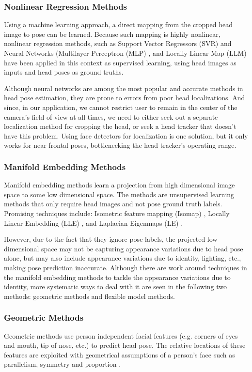 \documentclass{ut-thesis}
\begin{document}
\subsubsection{Nonlinear Regression Methods}
Using a machine learning approach, a direct mapping from the cropped head image to pose can be learned.  Because such mapping is highly nonlinear, nonlinear regression methods, such as Support Vector Regressors (SVR) \cite{li2000support} and Neural Networks (Multilayer Perceptron (MLP) \cite{voit2008head}, and Locally Linear Map (LLM) \cite{kruger2002gabor} have been applied in this context as supervised learning, using head images as inputs and head poses as ground truths.

Although neural networks are among the most popular and accurate methods in head pose estimation, they are prone to errors from poor head localizations.  And since, in our application, we cannot restrict user to remain in the center of the camera's field of view at all times, we need to either seek out a separate localization method for cropping the head, or seek a head tracker that doesn't have this problem.  Using face detectors for localization is one solution, but it only works for near frontal poses, bottlenecking the head tracker's operating range.


\subsubsection{Manifold Embedding Methods}
Manifold embedding methods learn a projection from high dimensional image space to some low dimensional space.  The methods are unsupervised learning methods that only require head images and not pose ground truth labels.  Promising techniques include: Isometric feature mapping (Isomap) \cite{raytchev2004head}, Locally Linear Embedding (LLE) \cite{roweis2000nonlinear}, and Laplacian Eigenmaps (LE) \cite{belkin2003laplacian}.


However, due to the fact that they ignore pose labels, the projected low dimensional space may not be capturing appearance variations due to head pose alone, but may also include appearance variations due to identity, lighting, etc., making pose prediction inaccurate.  Although there are work around techniques in the manifold embedding methods to tackle the appearance variations due to identity, more systematic ways to deal with it are seen in the following two methods: geometric methods and flexible model methods.


\subsubsection{Geometric Methods}
Geometric methods use person independent facial features (e.g. corners of eyes and mouth, tip of nose, etc.) to predict head pose.  The relative locations of these features are exploited with geometrical assumptions of a person's face such as parallelism, symmetry and proportion \cite{wang2007enhancement}.
\end{document}
